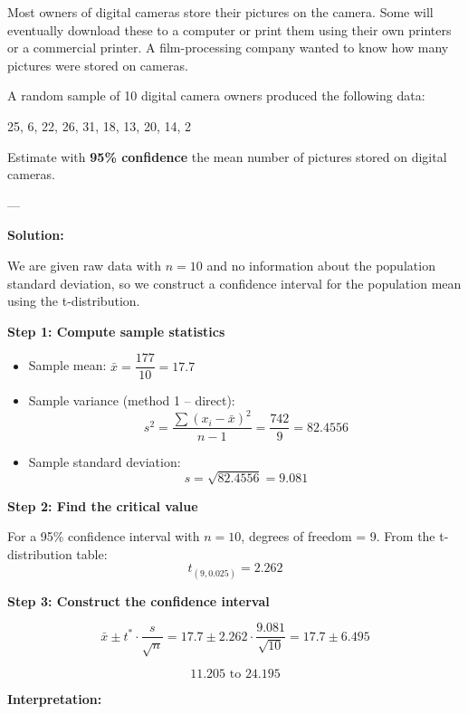 \begin{example}

Most owners of digital cameras store their pictures on the camera. Some will eventually download these to a computer or print them using their own printers or a commercial printer. A film-processing company wanted to know how many pictures were stored on cameras.

A random sample of 10 digital camera owners produced the following data:

\begin{center}
25, 6, 22, 26, 31, 18, 13, 20, 14, 2
\end{center}

Estimate with \textbf{95\% confidence} the mean number of pictures stored on digital cameras.


---

\textbf{Solution:}

We are given raw data with \(n = 10\) and no information about the population standard deviation, so we construct a confidence interval for the population mean using the t-distribution.

\vspace{1em}
\textbf{Step 1: Compute sample statistics}

\begin{itemize}
  \item Sample mean: \(\bar{x} = \dfrac{177}{10} = 17.7\)
  \item Sample variance (method 1 – direct): 
  \[
  s^2 = \dfrac{\sum (x_i - \bar{x})^2}{n - 1} = \dfrac{742}{9} = 82.4556
  \]
  \item Sample standard deviation:
  \[
  s = \sqrt{82.4556} = 9.081
  \]
\end{itemize}

\vspace{1em}
\textbf{Step 2: Find the critical value}

For a 95\% confidence interval with \(n = 10\), degrees of freedom = 9. From the t-distribution table:
\[
t_{(9, 0.025)} = 2.262
\]

\vspace{1em}
\textbf{Step 3: Construct the confidence interval}

\[
\bar{x} \pm t^* \cdot \dfrac{s}{\sqrt{n}} = 17.7 \pm 2.262 \cdot \dfrac{9.081}{\sqrt{10}} = 17.7 \pm 6.495
\]

\[
\boxed{11.205 \text{ to } 24.195}
\]

\vspace{1em}
\textbf{Interpretation:}


\end{example}

